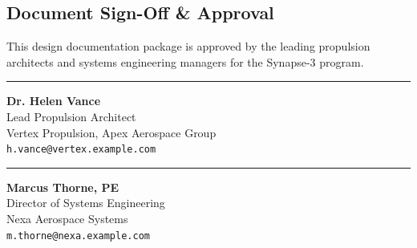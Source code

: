 \subsection{Document Sign-Off \& Approval}
This design documentation package is approved by the leading propulsion architects and systems engineering managers for the Synapse-3 program.

\vspace{2.0cm}

\noindent
\begin{minipage}{0.48\textwidth}
    \hrule
    \vspace{0.5em}
    \textbf{Dr. Helen Vance} \\
    Lead Propulsion Architect \\
    Vertex Propulsion, Apex Aerospace Group \\
    \texttt{h.vance@vertex.example.com}
\end{minipage}
\hfill
\begin{minipage}{0.48\textwidth}
    \hrule
    \vspace{0.5em}
    \textbf{Marcus Thorne, PE} \\
    Director of Systems Engineering \\
    Nexa Aerospace Systems \\
    \texttt{m.thorne@nexa.example.com}
\end{minipage}
